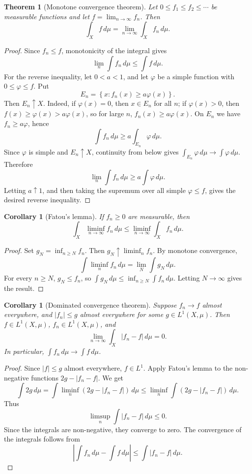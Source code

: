 \documentclass[11pt,openany]{book}
\numberwithin{equation}{chapter}
\theoremstyle{definition}
\theoremstyle{plain}
\newtheorem{theorem}[definition]{Theorem}
\newtheorem{corollary}[definition]{Corollary}
\theoremstyle{remark}
\newcommand{\1}{\mathbf{1}}
\newcommand{\dd}{\,d}
\newcommand{\abs}[1]{\left\lvert #1\right\rvert}
\newcommand{\set}[1]{\left\{#1\right\}}
\begin{document}
\begin{theorem}[Monotone convergence theorem]
Let \(0\leq f_1\leq f_2\leq\cdots\) be measurable functions and let \(f=\lim_{n\to\infty}f_n\). Then
\[
  \int_X f\dd\mu=\lim_{n\to\infty}\int_X f_n\dd\mu.
\]
\end{theorem}

\begin{proof}
Since \(f_n\leq f\), monotonicity of the integral gives
\[
  \lim_n\int f_n\dd\mu\leq\int f\dd\mu.
\]
For the reverse inequality, let \(0<a<1\), and let \(\varphi\) be a simple function with \(0\leq\varphi\leq f\). Put
\[
  E_n=\set{x:f_n(x)\geq a\varphi(x)}.
\]
Then \(E_n\uparrow X\). Indeed, if \(\varphi(x)=0\), then \(x\in E_n\) for all \(n\); if \(\varphi(x)>0\), then \(f(x)\geq\varphi(x)>a\varphi(x)\), so for large \(n\), \(f_n(x)\geq a\varphi(x)\). On \(E_n\) we have \(f_n\geq a\varphi\), hence
\[
  \int f_n\dd\mu\geq a\int_{E_n}\varphi\dd\mu.
\]
Since \(\varphi\) is simple and \(E_n\uparrow X\), continuity from below gives \(\int_{E_n}\varphi\dd\mu\to\int\varphi\dd\mu\). Therefore
\[
  \lim_n\int f_n\dd\mu\geq a\int\varphi\dd\mu.
\]
Letting \(a\uparrow1\), and then taking the supremum over all simple \(\varphi\leq f\), gives the desired reverse inequality.
\end{proof}

\begin{corollary}[Fatou's lemma]
If \(f_n\geq0\) are measurable, then
\[
  \int_X \liminf_{n\to\infty}f_n\dd\mu
  \leq \liminf_{n\to\infty}\int_X f_n\dd\mu.
\]
\end{corollary}

\begin{proof}
Set \(g_N=\inf_{n\geq N}f_n\). Then \(g_N\uparrow\liminf_nf_n\). By monotone convergence,
\[
  \int\liminf_nf_n\dd\mu=\lim_N\int g_N\dd\mu.
\]
For every \(n\geq N\), \(g_N\leq f_n\), so \(\int g_N\dd\mu\leq\inf_{n\geq N}\int f_n\dd\mu\). Letting \(N\to\infty\) gives the result.
\end{proof}

\begin{corollary}[Dominated convergence theorem]
Suppose \(f_n\to f\) almost everywhere, and \(\abs{f_n}\leq g\) almost everywhere for some \(g\in L^1(X,\mu)\). Then \(f\in L^1(X,\mu)\), \(f_n\in L^1(X,\mu)\), and
\[
  \lim_{n\to\infty}\int_X\abs{f_n-f}\dd\mu=0.
\]
In particular, \(\int f_n\dd\mu\to\int f\dd\mu\).
\end{corollary}

\begin{proof}
Since \(\abs{f}\leq g\) almost everywhere, \(f\in L^1\). Apply Fatou's lemma to the non-negative functions \(2g-\abs{f_n-f}\). We get
\[
  \int 2g\dd\mu
  =\int \liminf_n(2g-\abs{f_n-f})\dd\mu
  \leq \liminf_n\int(2g-\abs{f_n-f})\dd\mu.
\]
Thus
\[
  \limsup_n\int\abs{f_n-f}\dd\mu\leq0.
\]
Since the integrals are non-negative, they converge to zero. The convergence of the integrals follows from
\[
  \abs{\int f_n\dd\mu-\int f\dd\mu}\leq\int\abs{f_n-f}\dd\mu.
\]
\end{proof}
\end{document}
